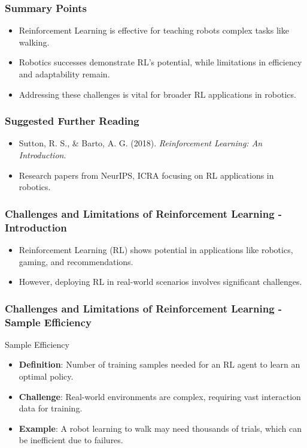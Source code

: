 \documentclass[aspectratio=169]{beamer}
\begin{document}
\begin{frame}[fragile]
    \frametitle{Summary Points}
    \begin{itemize}
        \item Reinforcement Learning is effective for teaching robots complex tasks like walking.
        \item Robotics successes demonstrate RL's potential, while limitations in efficiency and adaptability remain.
        \item Addressing these challenges is vital for broader RL applications in robotics.
    \end{itemize}
\end{frame}

\begin{frame}[fragile]
    \frametitle{Suggested Further Reading}
    \begin{itemize}
        \item Sutton, R. S., \& Barto, A. G. (2018). \textit{Reinforcement Learning: An Introduction}.
        \item Research papers from NeurIPS, ICRA focusing on RL applications in robotics.
    \end{itemize}
\end{frame}

\begin{frame}[fragile]
    \frametitle{Challenges and Limitations of Reinforcement Learning - Introduction}
    \begin{itemize}
        \item Reinforcement Learning (RL) shows potential in applications like robotics, gaming, and recommendations.
        \item However, deploying RL in real-world scenarios involves significant challenges.
    \end{itemize}
\end{frame}

\begin{frame}[fragile]
    \frametitle{Challenges and Limitations of Reinforcement Learning - Sample Efficiency}
    \begin{block}{Sample Efficiency}
        \begin{itemize}
            \item \textbf{Definition}: Number of training samples needed for an RL agent to learn an optimal policy.
            \item \textbf{Challenge}: Real-world environments are complex, requiring vast interaction data for training.
            \item \textbf{Example}: A robot learning to walk may need thousands of trials, which can be inefficient due to failures.
        \end{itemize}
    \end{block}
\end{frame}
\end{document}
